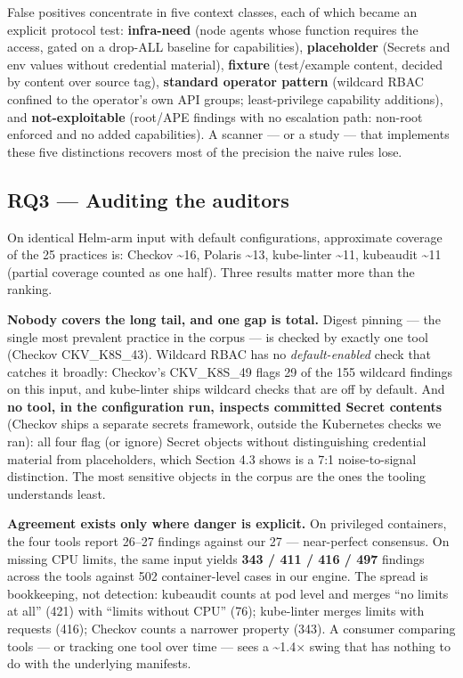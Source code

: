 \documentclass[pdflatex,sn-basic]{sn-jnl}
\begin{document}
False positives concentrate in five context classes, each of which
became an explicit protocol test: \textbf{infra-need} (node agents whose
function requires the access, gated on a drop-ALL baseline for
capabilities), \textbf{placeholder} (Secrets and env values without
credential material), \textbf{fixture} (test/example content, decided by
content over source tag), \textbf{standard operator pattern} (wildcard
RBAC confined to the operator's own API groups; least-privilege
capability additions), and \textbf{not-exploitable} (root/APE findings
with no escalation path: non-root enforced and no added capabilities). A
scanner --- or a study --- that implements these five distinctions
recovers most of the precision the naive rules lose.

\FloatBarrier

\hypertarget{rq3-auditing-the-auditors}{%
\subsection{RQ3 --- Auditing the
auditors}\label{rq3-auditing-the-auditors}}

On identical Helm-arm input with default configurations, approximate
coverage of the 25 practices is: Checkov \textasciitilde16, Polaris
\textasciitilde13, kube-linter \textasciitilde11, kubeaudit
\textasciitilde11 (partial coverage counted as one half). Three results
matter more than the ranking.

\textbf{Nobody covers the long tail, and one gap is total.} Digest
pinning --- the single most prevalent practice in the corpus --- is
checked by exactly one tool (Checkov CKV\_K8S\_43). Wildcard RBAC has no
\emph{default-enabled} check that catches it broadly: Checkov's
CKV\_K8S\_49 flags 29 of the 155 wildcard findings on this input, and
kube-linter ships wildcard checks that are off by default. And
\textbf{no tool, in the configuration run, inspects committed Secret
contents} (Checkov ships a separate secrets framework, outside the
Kubernetes checks we ran): all four flag (or ignore) Secret objects
without distinguishing credential material from placeholders, which
Section 4.3 shows is a 7:1 noise-to-signal distinction. The most
sensitive objects in the corpus are the ones the tooling understands
least.

\textbf{Agreement exists only where danger is explicit.} On privileged
containers, the four tools report 26--27 findings against our 27 ---
near-perfect consensus. On missing CPU limits, the same input yields
\textbf{343 / 411 / 416 / 497} findings across the tools against 502
container-level cases in our engine. The spread is bookkeeping, not
detection: kubeaudit counts at pod level and merges ``no limits at all''
(421) with ``limits without CPU'' (76); kube-linter merges limits with
requests (416); Checkov counts a narrower property (343). A consumer
comparing tools --- or tracking one tool over time --- sees a
\textasciitilde1.4$\times$ swing that has nothing to do with the underlying
manifests.
\end{document}
